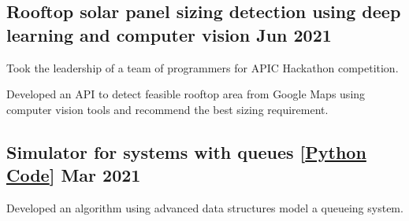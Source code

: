 \documentclass[letter,11pt]{article}
\begin{document}
\subsection{Rooftop solar panel sizing detection using deep learning and computer vision \hfill Jun 2021}
\begin{zitemize}
 \item Took the leadership of a team of programmers for APIC Hackathon competition.
	\item Developed an API to detect feasible rooftop area from Google Maps using computer vision tools and recommend the best sizing requirement. 
\end{zitemize}

\subsection{Simulator for systems with queues [\href{https://github.com/Hadi2525/queueing_theory}{Python Code}] \hfill Mar 2021}
\begin{zitemize}
	\item Developed an algorithm using advanced data structures model a queueing system.
\end{zitemize}


\end{document}
